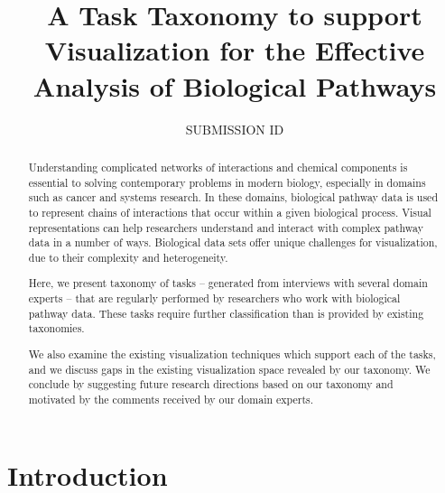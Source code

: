 \documentclass{egpubl}
\title[A Task Taxonomy to support Visualization for the Effective Analysis of Biological Pathways]%
      {A Task Taxonomy to support Visualization for the Effective Analysis of Biological Pathways}
\author[]{SUBMISSION ID}
\begin{document}

\maketitle

\begin{abstract}
Understanding complicated networks of interactions and chemical components is essential to solving contemporary problems in modern biology, especially in domains such as cancer and systems research.
In these domains, biological pathway data is used to represent chains of interactions that occur within a given biological process.
Visual representations can help researchers understand and interact with complex pathway data in a number of ways.
Biological data sets offer unique challenges for visualization, due to their complexity and heterogeneity.

Here, we present taxonomy of tasks -- generated from interviews with several domain experts -- that are regularly performed by researchers who work with biological pathway data.
These tasks require further classification than is provided by existing taxonomies.


We also examine the existing visualization techniques which support each of the tasks, and we discuss gaps in the existing visualization space revealed by our taxonomy.
We conclude by suggesting future research directions based on our taxonomy and motivated by the comments received by our domain experts.


\begin{classification} %
\end{classification}

\end{abstract}

\section{Introduction}
\end{document}
